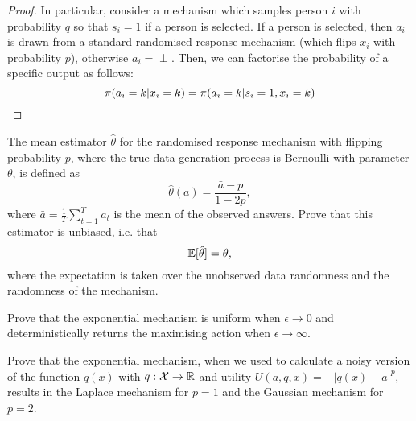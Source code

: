 {\begin{proof}
      In particular, consider a mechanism which samples person $i$ with
      probability $q$ so that $s_i = 1$ if a person is selected. If a
      person is selected, then $a_i$ is drawn from a standard randomised
      response mechanism (which flips $x_i$ with probability $p$),
      otherwise $a_i = \perp$.  Then, we can factorise the probability
      of a specific output as follows:
      \[
        \pi(a_i = k | x_i = k) =  \pi(a_i = k | s_i = 1, x_i = k) 
      \]
    \end{proof}
  \fi
  \begin{exercise}
    The mean estimator $\hat{\theta}$ for the randomised response mechanism with flipping probability $p$, where the true data generation process is Bernoulli with parameter $\theta$, is defined as
    \[
      \hat{\theta}(a) = \frac{\bar{a} - p}{1 - 2p},
    \]
    where $\bar{a} = \frac{1}{T} \sum_{t=1}^T a_t$ is the mean of the observed answers. Prove that this estimator is unbiased, i.e. that
    \[
      \mathop{\mbox{\ensuremath{\mathbb{E}}}}\nolimits[\hat{\theta}] = \theta,
    \]
    where the expectation is taken over the unobserved data randomness and the randomness of the mechanism.
    \label{exer:rp-unbiased-estimator}
  \end{exercise}
  
  \begin{exercise}
    Prove that the exponential mechanism is uniform when $\epsilon \to 0$ and deterministically returns the maximising action when $\epsilon \to \infty$.
    \label{exer:exp-randomness}
  \end{exercise}

  \begin{exercise}
    Prove that the exponential mechanism, when we used to calculate a noisy version of the function $q(x)$ with $q : {\mathcal{X}} \to {\mathbb{R}}$ and utility $U(a,q,x) = -|q(x) - a|^p$, results in the Laplace mechanism for $p=1$ and the Gaussian mechanism for $p = 2$.
    \label{exer:exp-laplace-gauss}
  \end{exercise}

}
